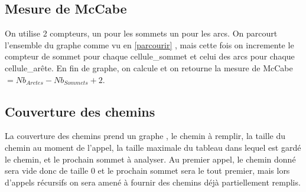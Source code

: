 \documentclass[a4paper,11pt]{article}
\begin{document}
	\subsection{Mesure de McCabe}
		On utilise 2 compteurs, un pour les sommets un pour les arcs. On parcourt l'ensemble du graphe comme vu en \ref{parcourir} , mais cette fois on incremente le compteur de sommet pour chaque cellule\_sommet et celui des arcs pour chaque cellule\_arête. En fin de graphe, on calcule et on retourne la mesure de McCabe $= Nb_{Aretes} - Nb_{Sommets} + 2$.
	\subsection{Couverture des chemins}
		La couverture des chemins prend un graphe , le chemin à remplir, la taille du chemin au moment de l'appel, la taille maximale du tableau dans lequel est gardé le chemin, et le prochain sommet à analyser. Au premier appel, le chemin donné sera vide donc de taille 0 et le prochain sommet sera le tout premier, mais lors d'appels récursifs on sera amené à fournir des chemins déjà partiellement remplis.
\end{document}
